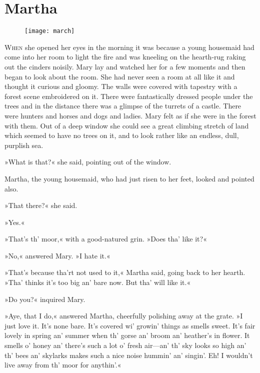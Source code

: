 \chapter{Martha} 
	
\begin{figure}[t!]
\centering
\texttt{[image: march]}
\end{figure}

	\lettrine[lines=6]{W}{hen} she opened her eyes in the morning it was because a young housemaid had come into her room to light the fire and was kneeling on the hearth-rug raking out the cinders noisily. Mary lay and watched her for a few moments and then began to look about the room. She had never seen a room at all like it and thought it curious and gloomy. The walls were covered with tapestry with a forest scene embroidered on it. There were fantastically dressed people under the trees and in the distance there was a glimpse of the turrets of a castle. There were hunters and horses and dogs and ladies. Mary felt as if she were in the forest with them. Out of a deep window she could see a great climbing stretch of land which seemed to have no trees on it, and to look rather like an endless, dull, purplish sea.

»What is that?« she said, pointing out of the window.

Martha, the young housemaid, who had just risen to her feet, looked and pointed also.

»That there?« she said.

»Yes.«

»That's th' moor,« with a good-natured grin. »Does tha' like it?«

»No,« answered Mary. »I hate it.«

»That's because tha'rt not used to it,« Martha said, going back to her hearth. »Tha' thinks it's too big an' bare now. But tha' will like it.«

»Do you?« inquired Mary.

»Aye, that I do,« answered Martha, cheerfully polishing away at the grate. »I just love it. It's none bare. It's covered wi' growin' things as smells sweet. It's fair lovely in spring an' summer when th' gorse an' broom an' heather's in flower. It smells o' honey an' there's such a lot o' fresh air—an' th' sky looks so high an' th' bees an' skylarks makes such a nice noise hummin' an' singin'. Eh! I wouldn't live away from th' moor for anythin'.«

